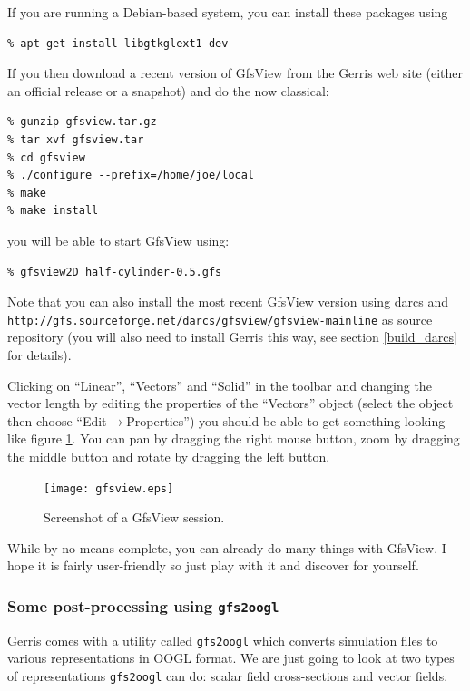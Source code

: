 \documentclass[a4paper]{article}
\begin{document}
If you are running a Debian-based system, you can install these packages using
\begin{verbatim}
% apt-get install libgtkglext1-dev
\end{verbatim}

If you then download a recent version of GfsView from the Gerris web
site (either an official release or a snapshot) and do the now classical:
\begin{verbatim}
% gunzip gfsview.tar.gz
% tar xvf gfsview.tar
% cd gfsview
% ./configure --prefix=/home/joe/local
% make
% make install
\end{verbatim}
you will be able to start GfsView using:
\begin{verbatim}
% gfsview2D half-cylinder-0.5.gfs
\end{verbatim}
Note that you can also install the most recent GfsView version using
darcs and {\tt http://gfs.sourceforge.net/darcs/gfsview/gfsview-mainline} as source
repository (you will also need to install Gerris this way, see section
\ref{build_darcs} for details).

Clicking on ``Linear'', ``Vectors'' and ``Solid'' in the toolbar and
changing the vector length by editing the properties of the
``Vectors'' object (select the object then choose
``Edit$\rightarrow$Properties'') you should be able to get something
looking like figure \ref{fig:gfsview}. You can pan by dragging the right
mouse button, zoom by dragging the middle button and rotate by
dragging the left button.
\begin{figure}[htbp]
\begin{center}
\texttt{[image: gfsview.eps]}
\end{center}
\caption{Screenshot of a GfsView session.}
\label{fig:gfsview}
\end{figure}

While by no means complete, you can already do many things with
GfsView. I hope it is fairly user-friendly so just play with it and
discover for yourself.

\subsubsection{Some post-processing using {\tt gfs2oogl}}

Gerris comes with a utility called {\tt gfs2oogl} which converts
simulation files to various representations in {\sc OOGL} format. We are
just going to look at two types of representations {\tt gfs2oogl} can
do: scalar field cross-sections and vector fields.
\end{document}
